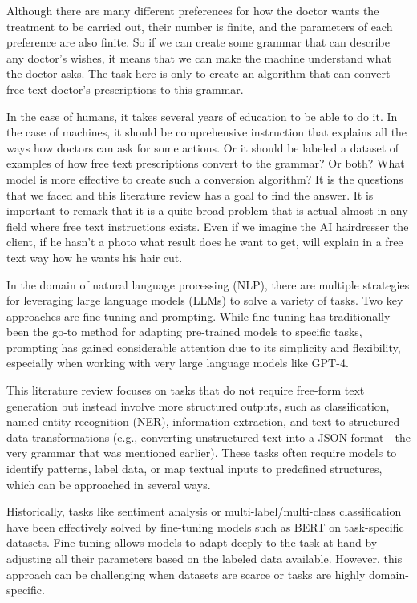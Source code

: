 \documentclass[11pt]{article}
\begin{document}
Although there are many different preferences for how the doctor wants the treatment to be carried out, their number is finite, and the parameters of each preference are also finite. So if we can create some grammar that can describe any doctor's wishes, it means that we can make the machine understand what the doctor asks. The task here is only to create an algorithm that can convert free text doctor's prescriptions to this grammar. 

In the case of humans, it takes several years of education to be able to do it. In the case of machines, it should be comprehensive instruction that explains all the ways how doctors can ask for some actions. Or it should be labeled a dataset of examples of how free text prescriptions convert to the grammar? Or both? What model is more effective to create such a conversion algorithm? It is the questions that we faced and this literature review has a goal to find the answer. It is important to remark that it is a quite broad problem that is actual almost in any field where free text instructions exists. Even if we imagine the AI hairdresser the client, if he hasn't a photo what result does he want to get, will explain in a free text way how he wants his hair cut.

In the domain of natural language processing (NLP), there are multiple strategies for leveraging large language models (LLMs) to solve a variety of tasks. Two key approaches are fine-tuning and prompting. While fine-tuning has traditionally been the go-to method for adapting pre-trained models to specific tasks, prompting has gained considerable attention due to its simplicity and flexibility, especially when working with very large language models like GPT-4.

This literature review focuses on tasks that do not require free-form text generation but instead involve more structured outputs, such as classification, named entity recognition (NER), information extraction, and text-to-structured-data transformations (e.g., converting unstructured text into a JSON format - the very grammar that was mentioned earlier). These tasks often require models to identify patterns, label data, or map textual inputs to predefined structures, which can be approached in several ways.

Historically, tasks like sentiment analysis or multi-label/multi-class classification have been effectively solved by fine-tuning models such as BERT on task-specific datasets. Fine-tuning allows models to adapt deeply to the task at hand by adjusting all their parameters based on the labeled data available. However, this approach can be challenging when datasets are scarce or tasks are highly domain-specific.
\end{document}
